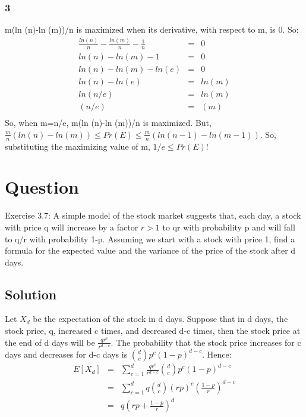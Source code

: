 \documentclass[10pt]{article}
\begin{document}
\subsubsection*{3} m(ln (n)-ln (m))/n is maximized when its derivative, with respect to m, is 0. So:
\begin{eqnarray}
\frac{ln(n)}{n} - \frac{ln(m)}{n} - \frac{1}{n} &=& 0\\
ln(n) - ln(m) - 1 &=& 0\\
ln(n) - ln(m) - ln(e) &=& 0\\
ln(n) - ln(e) &=& ln(m)\\
ln(n/e) &=& ln(m)\\
(n/e) &=& (m)\\
\end{eqnarray}
So, when m=n/e, m(ln (n)-ln (m))/n is maximized. But, $\frac{m}{n}(ln(n) - ln(m)) \leq Pr(E) \leq \frac{m}{n}(ln (n-1) - ln (m-1))$. So, substituting the maximizing value of m, $1/e \leq Pr(E)$!

\section{Question}

Exercise 3.7: A simple model of the stock market suggests that, each day, a stock with price q will increase by a factor $r>1$ to qr with probability p and will fall to q/r with probability 1-p. Assuming we start with a stock with price 1, find a formula for the expected value and the variance of the price of the stock after d days.

\subsection{Solution}

Let $X_{d}$ be the expectation of the stock in d days. Suppose that in d days, the stock price, q, increased c times, and decreased d-c times, then the stock price at the end of d days will be $\frac{qr^{c}}{r^{d-c}}$. The probability that the stock price increases for c days and decreases for d-c days is $\binom{d}{c}p^{c}(1-p)^{d-c}$. Hence:
\begin{eqnarray}
E[X_{d}] &=& \sum_{c=1}^{d} \frac{qr^{c}}{r^{d-c}}\binom{d}{c}p^{c}(1-p)^{d-c} \\
&=&  \sum_{c=1}^{d} q\binom{d}{c}(rp)^{c}(\frac{1-p}{r})^{d-c}\\
&=& q(rp+\frac{1-p}{r})^{d}\\
\end{eqnarray}
\end{document}
